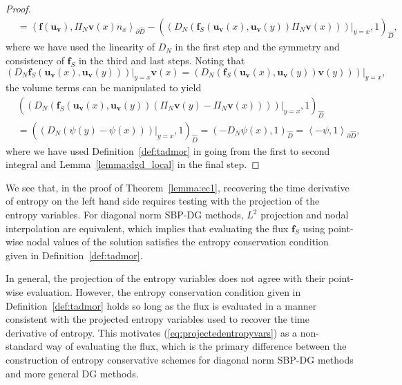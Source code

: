 \documentclass[preprint,10pt]{elsarticle}
\theoremstyle{definition}
\theoremstyle{lemma}
\theoremstyle{theorem}
\theoremstyle{assumption}
\newcommand{\LRp}[1]{\left( #1 \right)}
\newcommand{\LRa}[1]{\left\langle #1 \right\rangle}
\begin{document}
\begin{proof}
\begin{align*}
&= \LRa{\bm{f}(\bm{u}_{\bm{v}}), \Pi_N\bm{v}(x){n}_x}_{\partial \widehat{D}}  - \LRp{\left.\LRp{D_N\LRp{\bm{f}_S(\bm{u}_{\bm{v}}(x),\bm{u}_{\bm{v}}(y))\Pi_N\bm{v}(x)} }\right|_{y=x},1}_{\widehat{D}},
\end{align*}
where we have used the linearity of $D_N$ in the first step and the symmetry and consistency of $\bm{f}_S$ in the third and last steps.  
Noting that 
\[
\left.\LRp{D_N \bm{f}_S(\bm{u}_{\bm{v}}(x),\bm{u}_{\bm{v}}(y))}\right|_{y=x}\bm{v}(x) = \left.\LRp{D_N \LRp{\bm{f}_S(\bm{u}_{\bm{v}}(x),\bm{u}_{\bm{v}}(y))\bm{v}(y)}}\right|_{y=x},
\]
the volume terms can be manipulated to yield
\begin{align*}
&\LRp{\left.\LRp{D_N \LRp{\bm{f}_S(\bm{u}_{\bm{v}}(x),\bm{u}_{\bm{v}}(y))\LRp{\Pi_N\bm{v}(y)-\Pi_N\bm{v}(x)} }}\right|_{y=x},1}_{\widehat{D}} \\
&= \LRp{ \left.\LRp{D_N\LRp{\psi(y)-\psi(x) }}\right|_{y=x},1}_{\widehat{D}} = \LRp{-D_N \psi(x),1}_{\widehat{D}} = \LRa{-\psi,1}_{\partial \widehat{D}},
\end{align*}
where we have used Definition~\ref{def:tadmor} in going from the first to second integral and Lemma~\ref{lemma:dgd_local} in the final step.  
\end{proof}

We see that, in the proof of Theorem~\ref{lemma:ec1}, recovering the time derivative of entropy on the left hand side requires testing with the projection of the entropy variables.  For diagonal norm SBP-DG methods, $L^2$ projection and nodal interpolation are equivalent, which implies that evaluating the flux $\bm{f}_S$ using point-wise nodal values of the solution satisfies the entropy conservation condition given in Definition~\ref{def:tadmor}.  %

In general, the projection of the entropy variables does not agree with their point-wise evaluation.  However, the entropy conservation condition given in Definition~\ref{def:tadmor} holds so long as the flux is evaluated in a manner consistent with the projected entropy variables used to recover the time derivative of entropy.  This motivates (\ref{eq:projectedentropyvars}) as a non-standard way of evaluating the flux, which is the primary difference between the construction of entropy conservative schemes for diagonal norm SBP-DG methods and more general DG methods.  
\end{document}
